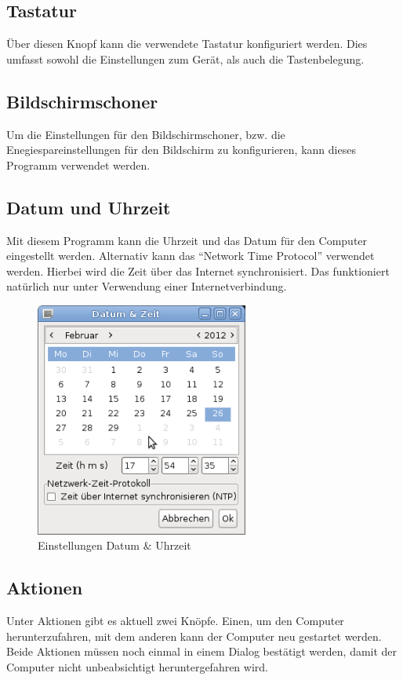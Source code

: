 \documentclass[a4paper,12pt,twoside]{article}
\begin{document}
\subsection{Tastatur}
\label{sct:tastatur}
Über diesen Knopf kann die verwendete Tastatur konfiguriert werden. Dies
umfasst sowohl die Einstellungen zum Gerät, als auch die
Tastenbelegung.


\subsection{Bildschirmschoner}
\label{bildschirmschoner}
Um die Einstellungen für den Bildschirmschoner, bzw. die
Enegiespareinstellungen für den Bildschirm zu konfigurieren, kann
dieses Programm verwendet werden.


\subsection{Datum und Uhrzeit}
\label{sct:datetime}
Mit diesem Programm kann die Uhrzeit und das Datum für den Computer
eingestellt werden. Alternativ kann das "`Network Time
Protocol"' verwendet werden. Hierbei wird die Zeit über
das Internet synchronisiert. Das funktioniert natürlich nur unter
Verwendung einer Internetverbindung.

\begin{figure}
    \centering
    \includegraphics[width=7cm]{efaLivede-img/efaLivede-img25.png}
    \caption{Einstellungen Datum \& Uhrzeit}
    \label{fig:datetime}
\end{figure}


\subsection{Aktionen}
\label{sct:aktionen}
Unter Aktionen gibt es aktuell zwei Knöpfe. Einen, um den Computer
herunterzufahren, mit dem anderen kann der Computer neu gestartet
werden. Beide Aktionen müssen noch einmal in einem Dialog bestätigt
werden, damit der Computer nicht unbeabsichtigt heruntergefahren wird.
\end{document}
